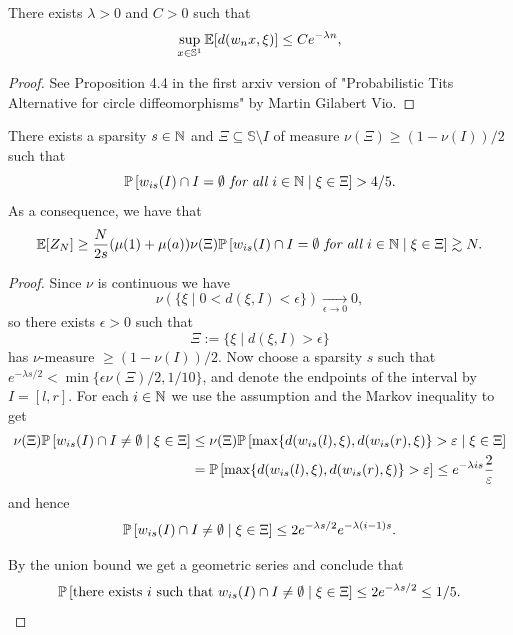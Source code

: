 \begin{proposition}
    There exists $\lambda>0$ and $C > 0$ such that
    $$\sup_{x \in \mathbb{S}^1} \E[d(w_n x, \xi)] \leq C e^{-\lambda n },$$
\end{proposition}
\begin{proof}
    See Proposition 4.4 in the first arxiv version of "Probabilistic Tits Alternative for circle diffeomorphisms" by Martin Gilabert Vio.
\end{proof}

\begin{lemma}
    There exists a sparsity $s \in \N$ and $\Xi \subseteq \mathbb{S}\setminus I$ of measure $\nu(\Xi) \ge (1-\nu(I))/2$ such that
    \[ \P\left[ w_{is}(I) \cap I = \emptyset \emph{ for all }i \in \N \mid \xi \in \Xi\right]  > 4/5.\]
    As a consequence, we have that
    \[\E [Z_N] \geq \frac{N}{2s} (\mu(1)+\mu(a)) \nu(\Xi) \P\left[ w_{is}(I) \cap I = \emptyset \emph{ for all }i \in \N \mid \xi \in \Xi\right] \gtrsim N.\]
\end{lemma}

\begin{proof}
    Since $\nu$ is continuous we have
    \[\nu(\{\xi \mid  0 < d(\xi,I)<\epsilon\}) \xrightarrow[\epsilon \to 0]{} 0,\]
    so there exists $\epsilon>0$ such that
    \[\Xi := \{\xi \mid  d(\xi,I)>\epsilon\}\]
    has $\nu$-measure $\geq (1-\nu(I))/2$.
    Now choose a sparsity $s$ such that $e^{-\lambda s/2} < \min\{\epsilon \nu(\Xi)/2, 1/10\}$, and denote the endpoints of the interval by $I = [l,r]$.
    For each $i \in \N$ we use the assumption and the Markov inequality to get
    \begin{align*} \nu(\Xi) \P\left[ w_{is}(I) \cap I \neq \emptyset \mid \xi \in \Xi\right]  
    & \leq \nu(\Xi) \P\left[  \max\{d(w_{is}(l), \xi), d(w_{is}(r), \xi)\} > \epsilon \mid \xi \in \Xi \right] \\ & = \P\left[ \max\{d(w_{is}(l), \xi), d(w_{is}(r), \xi)\} > \epsilon\right] 
    \leq e^{-\lambda is}\frac{2}{\epsilon}\end{align*} 
    and hence
    \[ \P\left[ w_{is}(I) \cap I \neq \emptyset \mid \xi \in \Xi \right] 
    \leq 2 e^{-\lambda s/2} e^{-\lambda (i-1)s}.\]
    
    By the union bound we get a geometric series and conclude that
    \[ \P\left[ \text{there exists }i \text{ such that }w_{is}(I) \cap I \neq \emptyset \mid \xi \in \Xi \right] \leq 2 e^{-\lambda s/2} \leq 1/5. \qedhere \]
\end{proof}

